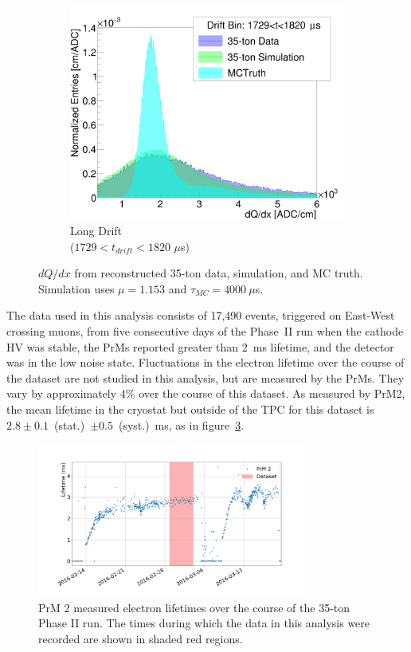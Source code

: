 \documentclass[10pt,a4paper]{article}
\begin{document}
\begin{figure}
\begin{subfigure}{0.33\linewidth}
\centering
\includegraphics[width=\textwidth]{long_dqdx.png}
\caption{Long Drift\\ ($1729<t_{drift}<1820$ $\mu$s)}
\label{fig:long_dqdx}
\end{subfigure}
\caption{$dQ/dx$ from reconstructed 35-ton data, simulation, and MC truth. Simulation uses $\mu=1.153$ and $\tau_{MC}=4000\ \mu$s.}
\label{fig:dqdx_examples}
\end{figure}

The data used in this analysis consists of 17,490 events, triggered on East-West crossing muons, from five consecutive days of the Phase~II run when the cathode HV was stable, the PrMs reported greater than 2~ms lifetime, and the detector was in the low noise state. Fluctuations in the electron lifetime over the course of the dataset are not studied in this analysis, but are measured by the PrMs. They vary by approximately 4\% over the course of this dataset. As measured by PrM2, the mean lifetime in the cryostat but outside of the TPC for this dataset is $2.8\pm0.1$~(stat.)~$\pm0.5$~(syst.)~ms, as in figure~\ref{fig:PrM2}. 

\begin{figure}
\centering
\includegraphics[width=0.8\textwidth]{PrM2.png}
\caption{PrM 2 measured electron lifetimes over the course of the 35-ton Phase II run. The times during which the data in this analysis were recorded are shown in shaded red regions.}
\label{fig:PrM2}
\end{figure}
\end{document}
